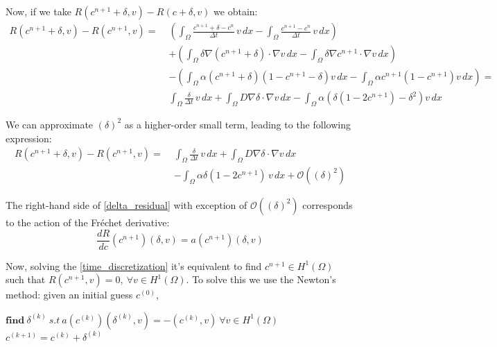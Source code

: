 \documentclass[12pt, a4paper, twoside, openright]{report}
\begin{document}
  
  Now, if we take $R(c^{n+1} + \delta, v)-R(c + \delta, v)$ we obtain:
  \begin{equation}
    \label{difference_residual}
    \begin{aligned}
        R(c^{n+1} + \delta, v) - R(c^{n+1}, v) =\; & 
        \left( \int_{\Omega} \frac{c^{n+1} + \delta - c^n}{\Delta t} \, v \, dx 
        - \int_{\Omega} \frac{c^{n+1} - c^n}{\Delta t} \, v \, dx \right) \\
        & + \left( \int_{\Omega} \delta \nabla (c^{n+1} + \delta) \cdot \nabla v \, dx 
        - \int_{\Omega} \delta \nabla c^{n+1} \cdot \nabla v \, dx \right) \\
        & - \left( \int_{\Omega} \alpha (c^{n+1} + \delta)(1 - c^{n+1} - \delta) v \, dx 
        - \int_{\Omega} \alpha c^{n+1}(1 - c^{n+1}) v \, dx \right)= \\
        & \int_{\Omega} \frac{\delta}{\Delta t} \, v \, dx 
        + \int_{\Omega} D \nabla \delta \cdot \nabla v \, dx  
        - \int_{\Omega} \alpha \left( \delta(1 - 2c^{n+1}) - \delta^2 \right) v \, dx
    \end{aligned}
\end{equation}
  
  We can approximate \( (\delta)^2 \) as a higher-order small term, leading to the following expression:
  \begin{equation}
  \label{delta_residual}
  \begin{aligned}
  R(c^{n+1} + \delta, v) - R(c^{n+1}, v) =\; & 
  \int_{\Omega} \frac{\delta}{\Delta t} \, v \, dx 
  + \int_{\Omega} D \nabla \delta \cdot \nabla v \, dx \\
  & - \int_{\Omega} \alpha \delta (1 - 2c^{n+1}) \, v \, dx 
  + \mathcal{O}((\delta)^2)
  \end{aligned}
  \end{equation}

The right-hand side of \autoref{delta_residual} with exception of $\mathcal{O}((\delta)^2)$ corresponds to the action of the Fréchet derivative:
  \[
  \frac{dR}{dc} (c^{n+1})(\delta, v) = a(c^{n+1})(\delta, v)
  \]

Now, solving the \autoref{time_discretization} it's equivalent to find $c^{n+1} \in H^1(\Omega)$ such that $R(c^{n+1}, v)=0, \ \forall v \in H^1(\Omega)$. To solve this we use the Newton's method: given an initial guess $c^{(0)}$,
\begin{algorithmic}
    \State $\textbf{find} \ \delta^{(k)} \ s.t \ a(c^{(k)})(\delta^{(k)}, v) = -(c^{(k)}, v) \ \forall v \in H^1(\Omega)$
    \State $c^{(k+1)}=c^{(k)}+\delta^{(k)}$
\EndWhile
\end{algorithmic}
\end{document}

